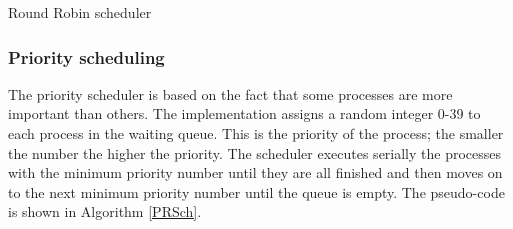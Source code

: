 \begin{algorithm}[H]                      
\caption{Round Robin scheduler}          
\label{RRSch}                           %
\begin{algorithmic}                    
        
        \ENDIF
        \ENDIF
    
    \ENDWHILE
\end{algorithmic}
\end{algorithm}
 
	\subsubsection{Priority scheduling}
The priority scheduler is based on the fact that some processes are more important than others. The implementation assigns a random integer 0-39 to each process in the waiting queue. This is the priority of the process; the smaller the number the higher the priority. The scheduler executes serially the processes with the minimum priority number until they are all finished and then moves on to the next minimum priority number until the queue is empty. The pseudo-code is shown in Algorithm \ref{PRSch}.

